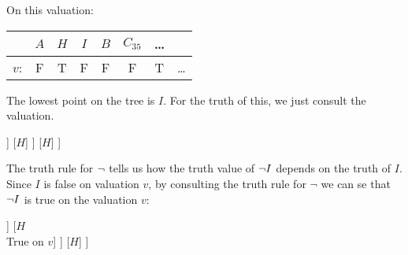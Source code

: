 On this valuation:
\begin{center}
	\begin{tabular}{rccccccc}
		&	$A$&$H$&$I$&$B$&$C_{35}$&\ldots\\\hline
		$v$:&	F & T &F&F&F&T&\ldots
	\end{tabular}
\end{center}
The lowest point on the tree is $I$. For the truth of this, we just consult the valuation. 
\begin{center}
	\begin{forest}
	[$(\enot I\eand H)\mainconnective{\eif} H$
	[$(\enot I\mainconnective{\eor} H)$
	[$\mainconnective{\enot} I$
	[$I$\\False on $v$]
	]
	[$H$]
	]
	[$H$]
	]
\end{forest}
\end{center}
%		

The truth rule for $\neg$ tells us how the truth value of $\neg I$ depends on the truth of $I$. 
Since $I$ is false on valuation $v$, by consulting the truth rule for $\neg$ we can se that $\neg I$ is true on the valuation $v$:
\begin{center}
	\begin{forest}
		[$(\enot I\eand H)\mainconnective{\eif} H$
		[$(\enot I\mainconnective{\eand} H)$
		[$\mainconnective{\enot} I$\\True on $v$
		[$I$\\False on $v$]
		]
		[$H$\\True on $v$]
		]
		[$H$]
		]
	\end{forest}
\end{center}

